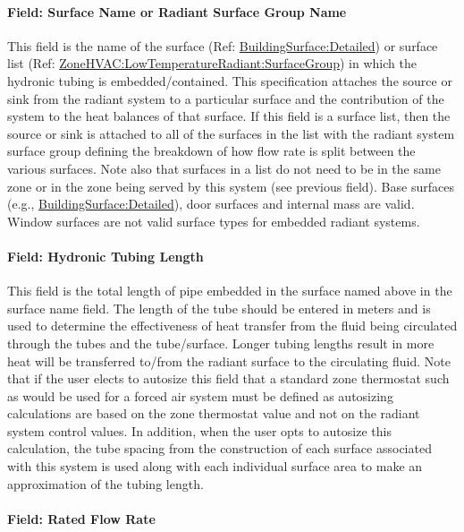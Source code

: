 \paragraph{Field: Surface Name or Radiant Surface Group Name}\label{field-surface-name-or-radiant-surface-group-name-1}

This field is the name of the surface (Ref: \hyperref[buildingsurfacedetailed]{BuildingSurface:Detailed}) or surface list (Ref: \hyperref[zonehvaclowtemperatureradiantsurfacegroup]{ZoneHVAC:LowTemperatureRadiant:SurfaceGroup}) in which the hydronic tubing is embedded/contained. This specification attaches the source or sink from the radiant system to a particular surface and the contribution of the system to the heat balances of that surface. If this field is a surface list, then the source or sink is attached to all of the surfaces in the list with the radiant system surface group defining the breakdown of how flow rate is split between the various surfaces. Note also that surfaces in a list do not need to be in the same zone or in the zone being served by this system (see previous field). Base surfaces (e.g., \hyperref[buildingsurfacedetailed]{BuildingSurface:Detailed}), door surfaces and internal mass are valid. Window surfaces are not valid surface types for embedded radiant systems.

\paragraph{Field: Hydronic Tubing Length}\label{field-hydronic-tubing-length-001}

This field is the total length of pipe embedded in the surface named above in the surface name field. The length of the tube should be entered in meters and is used to determine the effectiveness of heat transfer from the fluid being circulated through the tubes and the tube/surface. Longer tubing lengths result in more heat will be transferred to/from the radiant surface to the circulating fluid. Note that if the user elects to autosize this field that a standard zone thermostat such as would be used for a forced air system must be defined as autosizing calculations are based on the zone thermostat value and not on the radiant system control values. In addition, when the user opts to autosize this calculation, the tube spacing from the construction of each surface associated with this system is used along with each individual surface area to make an approximation of the tubing length.

\paragraph{Field: Rated Flow Rate}\label{field-rated-flow-rate}

